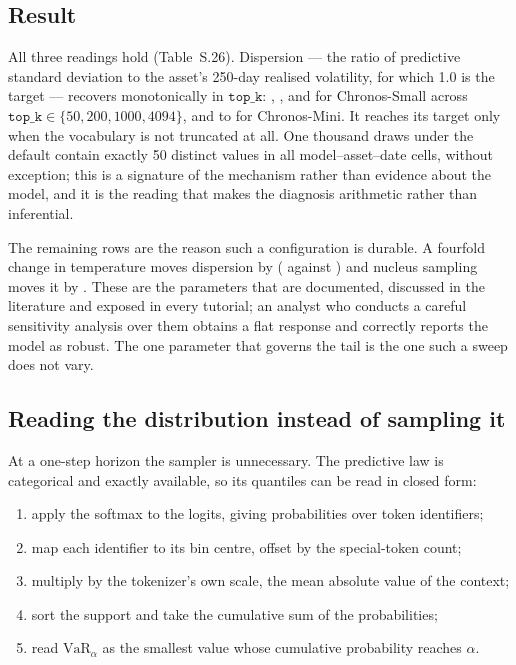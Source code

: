 \documentclass[preprint,11pt,authoryear]{elsarticle}
\newcommand{\1}{\boldsymbol{1}}
\begin{document}
\subsection{Result}
\label{app:mech_result}

All three readings hold (Table~S.26). Dispersion --- the ratio of predictive
standard deviation to the asset's 250-day realised volatility, for which 1.0 is
the target --- recovers monotonically in $\texttt{top\_k}$: \nDispDefaultSmall,
\nDispTwoHundredSmall, \nDispThousandSmall{} and \nDispFullSmall{} for
Chronos-Small across $\texttt{top\_k} \in \{50, 200, 1000, 4094\}$, and
\nDispDefaultMini{} to \nDispFullMini{} for Chronos-Mini. It reaches its target
only when the vocabulary is not truncated at all. One thousand draws under the
default contain exactly 50 distinct values in all \nDoseCells{}
model--asset--date cells, without exception; this is a signature of the mechanism
rather than evidence about the model, and it is the reading that makes the
diagnosis arithmetic rather than inferential.

The remaining rows are the reason such a configuration is durable. A fourfold
change in temperature moves dispersion by \nLitTempGap{} (\nDispTempLowSmall{} against
\nDispTempHighSmall) and nucleus sampling moves it by \nLitNucleusGap. These are the
parameters that are documented, discussed in the literature and exposed in every
tutorial; an analyst who conducts a careful sensitivity analysis over them
obtains a flat response and correctly reports the model as robust. The one
parameter that governs the tail is the one such a sweep does not vary.

\subsection{Reading the distribution instead of sampling it}
\label{app:mech_analytic}

At a one-step horizon the sampler is unnecessary. The predictive law is
categorical and exactly available, so its quantiles can be read in closed form:

\begin{enumerate}
	\item apply the softmax to the logits, giving probabilities over token
	identifiers;
	\item map each identifier to its bin centre, offset by the special-token
	count;
	\item multiply by the tokenizer's own scale, the mean absolute value of the
	context;
	\item sort the support and take the cumulative sum of the probabilities;
	\item read $\mathrm{VaR}_\alpha$ as the smallest value whose cumulative
	probability reaches $\alpha$.
\end{enumerate}
\end{document}
